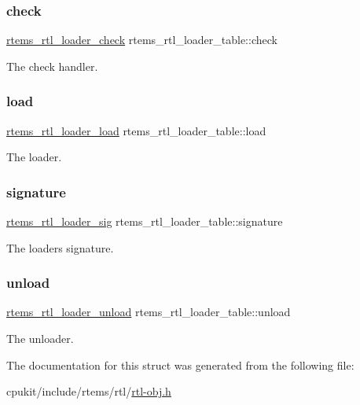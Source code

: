 \subsubsection{\texorpdfstring{check}{check}}
{\footnotesize\ttfamily \mbox{\hyperlink{rtl-obj_8h_ae65589434f7dfc4ab547022bef414e04}{rtems\+\_\+rtl\+\_\+loader\+\_\+check}} rtems\+\_\+rtl\+\_\+loader\+\_\+table\+::check}

The check handler. \mbox{\label{structrtems__rtl__loader__table_a4261c0025f78e6a0593987c4af80a038}} 
\subsubsection{\texorpdfstring{load}{load}}
{\footnotesize\ttfamily \mbox{\hyperlink{rtl-obj_8h_a6d119678fa2e324376060e8b09ea56cf}{rtems\+\_\+rtl\+\_\+loader\+\_\+load}} rtems\+\_\+rtl\+\_\+loader\+\_\+table\+::load}

The loader. \mbox{\label{structrtems__rtl__loader__table_aa7edd550b8c7d1d6981bf9aeda5cceb9}} 
\subsubsection{\texorpdfstring{signature}{signature}}
{\footnotesize\ttfamily \mbox{\hyperlink{rtl-obj_8h_a31673e6af5ca5b1e8ccb074cfac376ba}{rtems\+\_\+rtl\+\_\+loader\+\_\+sig}} rtems\+\_\+rtl\+\_\+loader\+\_\+table\+::signature}

The loader\textquotesingle{}s signature. \mbox{\label{structrtems__rtl__loader__table_aae9690746d567cef6da822c244db8fb8}} 
\subsubsection{\texorpdfstring{unload}{unload}}
{\footnotesize\ttfamily \mbox{\hyperlink{rtl-obj_8h_afacdc84b4af0a65a15b4ef38ebef6ab0}{rtems\+\_\+rtl\+\_\+loader\+\_\+unload}} rtems\+\_\+rtl\+\_\+loader\+\_\+table\+::unload}

The unloader. 

The documentation for this struct was generated from the following file\+:\begin{DoxyCompactItemize}
\item 
cpukit/include/rtems/rtl/\mbox{\hyperlink{rtl-obj_8h}{rtl-\/obj.\+h}}\end{DoxyCompactItemize}
